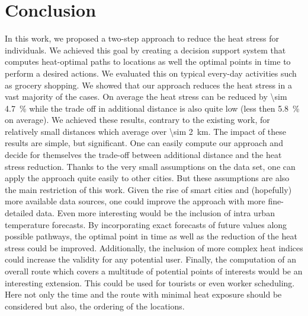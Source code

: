 
\section{Conclusion}

In this work, we proposed a two-step approach to reduce the heat stress for individuals. We achieved this goal by creating a decision support system that computes heat-optimal paths to locations as well the optimal points in time to perform a desired actions. We evaluated this on typical every-day activities such as grocery shopping. 
We showed that our approach reduces the heat stress in a vast majority of the cases. On average the heat stress can be reduced by \SI{\sim 4.7}{\percent} while the trade off in additional distance is also quite low (less then \SI{5.8}{\percent} on average). We achieved these results, contrary to the existing work, for relatively small distances which average over \SI{\sim  2}{\kilo\meter}.
The impact of these results are simple, but significant. One can easily compute our approach and decide for themselves the trade-off between additional distance and the heat stress reduction.
Thanks to the very small assumptions on the data set, one can apply the approach quite easily to other cities. 
But these assumptions are also the main restriction of this work. Given the rise of smart cities and (hopefully) more available data sources, one could improve the approach with more fine-detailed data. Even more interesting would be the inclusion of intra urban temperature forecasts. By incorporating exact forecasts of future values along possible pathways, the optimal point in time as well as the reduction of the heat stress could be improved. Additionally, the inclusion of more complex heat indices could increase the validity for any potential user. 
Finally, the computation of an overall route which covers a multitude of potential points of interests would be an interesting extension. This could be used for tourists or even worker scheduling. Here not only the time and the route with minimal heat exposure should be considered but also, the ordering of the locations.  